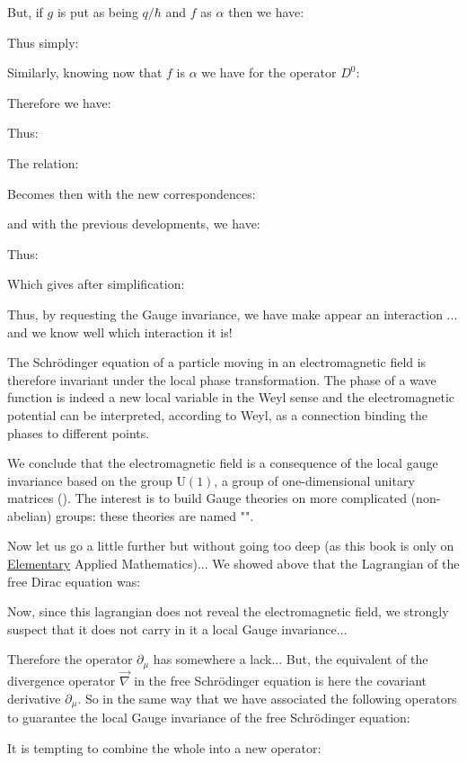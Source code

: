 	But, if $g$ is put as being $q/\hbar$ and $f$ as $\alpha$ then we have:
	
	Thus simply:
	
	Similarly, knowing now that $f$ is $\alpha$ we have for the operator $D^0$:
	
	Therefore we have:
	
	Thus:
	
	The relation:
	
	Becomes then with the new correspondences:
	
	and with the previous developments, we have:
	
	Thus:
	
	Which gives after simplification:
	
	Thus, by requesting the Gauge invariance, we have make appear an interaction ... and we know well which interaction it is!

	The Schrödinger equation of a particle moving in an electromagnetic field is therefore invariant under the local phase transformation. The phase of a wave function is indeed a new local variable in the Weyl sense and the electromagnetic potential can be interpreted, according to Weyl, as a connection binding the phases to different points.

	We conclude that the electromagnetic field is a consequence of the local gauge invariance based on the group $\text{U}(1)$, a group of one-dimensional unitary matrices (). The interest is to build Gauge theories on more complicated (non-abelian) groups: these theories are named "".

	Now let us go a little further but without going too deep (as this book is only on \underline{Elementary} Applied Mathematics)... We showed above that the Lagrangian of the free Dirac equation was:
	
	Now, since this lagrangian does not reveal the electromagnetic field, we strongly suspect that it does not carry in it a local Gauge invariance...
	
	Therefore the operator $\partial_\mu$ has somewhere a lack... But, the equivalent of the divergence operator $\vec{\nabla}$ in the free Schrödinger equation is here the covariant derivative $\partial_\mu$. So in the same way that we have associated the following operators to guarantee the local Gauge invariance of the free Schrödinger equation:
	
	It is tempting to combine the whole into a new operator:
	
